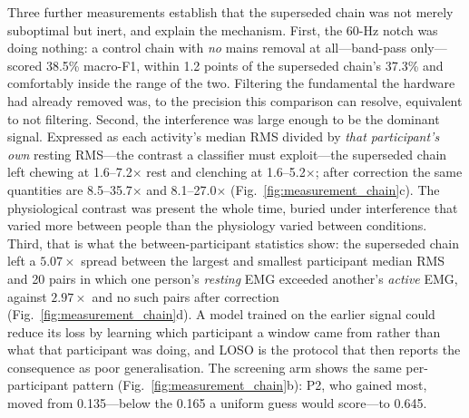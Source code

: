\documentclass[pdflatex,sn-nature,iicol]{sn-jnl}
\begin{document}
Three further measurements establish that the superseded chain was not merely suboptimal but inert, and explain the mechanism. First, the 60-Hz notch was doing nothing: a control chain with \emph{no} mains removal at all---band-pass only---scored 38.5\% macro-F1, within 1.2 points of the superseded chain's 37.3\% and comfortably inside the range of the two. Filtering the fundamental the hardware had already removed was, to the precision this comparison can resolve, equivalent to not filtering. Second, the interference was large enough to be the dominant signal. Expressed as each activity's median RMS divided by \emph{that participant's own} resting RMS---the contrast a classifier must exploit---the superseded chain left chewing at 1.6--7.2$\times$ rest and clenching at 1.6--5.2$\times$; after correction the same quantities are 8.5--35.7$\times$ and 8.1--27.0$\times$ (Fig.~\ref{fig:measurement_chain}c). The physiological contrast was present the whole time, buried under interference that varied more between people than the physiology varied between conditions. Third, that is what the between-participant statistics show: the superseded chain left a $5.07\times$ spread between the largest and smallest participant median RMS and 20 pairs in which one person's \emph{resting} EMG exceeded another's \emph{active} EMG, against $2.97\times$ and no such pairs after correction (Fig.~\ref{fig:measurement_chain}d). A model trained on the earlier signal could reduce its loss by learning which participant a window came from rather than what that participant was doing, and LOSO is the protocol that then reports the consequence as poor generalisation. The screening arm shows the same per-participant pattern (Fig.~\ref{fig:measurement_chain}b): P2, who gained most, moved from 0.135---below the 0.165 a uniform guess would score---to 0.645.
\end{document}

